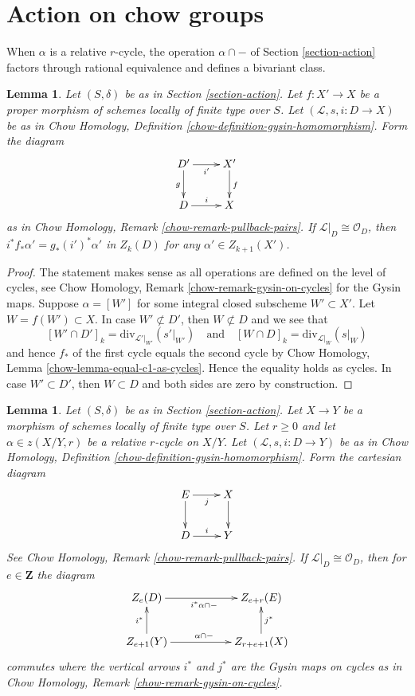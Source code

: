 \documentclass{stacks-project}
\theoremstyle{plain}
\newtheorem{lemma}[subsection]{Lemma}
\theoremstyle{definition}
\theoremstyle{remark}
\numberwithin{equation}{subsection}
\begin{document}
\section{Action on chow groups}
\label{section-action-chow}

\noindent
When $\alpha$ is a relative $r$-cycle, the operation $\alpha \cap -$
of Section \ref{section-action} factors through rational equivalence
and defines a bivariant class.

\begin{lemma}
\label{lemma-closed-in-X-gysin}
Let $(S, \delta)$ be as in Section \ref{section-action}.
Let $f : X' \to X$ be a proper morphism of schemes
locally of finite type over $S$.
Let $(\mathcal{L}, s, i : D \to X)$ be as in
Chow Homology, Definition \ref{chow-definition-gysin-homomorphism}.
Form the diagram
$$
\xymatrix{
D' \ar[d]_g \ar[r]_{i'} & X' \ar[d]^f \\
D \ar[r]^i & X
}
$$
as in Chow Homology, Remark \ref{chow-remark-pullback-pairs}.
If $\mathcal{L}|_D \cong \mathcal{O}_D$, then
$i^*f_*\alpha' = g_*(i')^*\alpha'$ in $Z_k(D)$
for any $\alpha' \in Z_{k + 1}(X')$.
\end{lemma}

\begin{proof}
The statement makes sense as all operations are defined on the level
of cycles, see Chow Homology, Remark \ref{chow-remark-gysin-on-cycles}
for the Gysin maps.
Suppose $\alpha = [W']$ for some integral closed subscheme
$W' \subset X'$. Let $W = f(W') \subset X$. In case $W' \not \subset D'$,
then $W \not \subset D$ and we see that
$$
[W' \cap D']_k = \text{div}_{\mathcal{L}'|_{W'}}({s'|_{W'}})
\quad\text{and}\quad
[W \cap D]_k = \text{div}_{\mathcal{L}|_W}(s|_W)
$$
and hence $f_*$ of the first cycle equals the second cycle by
Chow Homology, Lemma \ref{chow-lemma-equal-c1-as-cycles}. Hence the
equality holds as cycles. In case $W' \subset D'$, then
$W \subset D$ and both sides are zero by construction.
\end{proof}

\begin{lemma}
\label{lemma-action-gysin}
Let $(S, \delta)$ be as in Section \ref{section-action}.
Let $X \to Y$ be a morphism of schemes
locally of finite type over $S$. Let $r \geq 0$ and let
$\alpha \in z(X/Y, r)$ be a relative $r$-cycle on $X/Y$.
Let $(\mathcal{L}, s, i : D \to Y)$ be as in
Chow Homology, Definition \ref{chow-definition-gysin-homomorphism}.
Form the cartesian diagram
$$
\xymatrix{
E \ar[d] \ar[r]_j & X \ar[d] \\
D \ar[r]^i & Y
}
$$
See Chow Homology, Remark \ref{chow-remark-pullback-pairs}.
If $\mathcal{L}|_D \cong \mathcal{O}_D$, then for $e \in \mathbf{Z}$
the diagram
$$
\xymatrix{
Z_e(D) \ar[rr]_{i^*\alpha \cap -} & &
Z_{e + r}(E) \\
Z_{e + 1}(Y) \ar[u]^{i^*} \ar[rr]^{\alpha \cap -} & &
Z_{r + e + 1}(X) \ar[u]_{j^*}
}
$$
commutes where the vertical arrows $i^*$ and $j^*$ are the
Gysin maps on cycles as in
Chow Homology, Remark \ref{chow-remark-gysin-on-cycles}.
\end{lemma}
\end{document}
